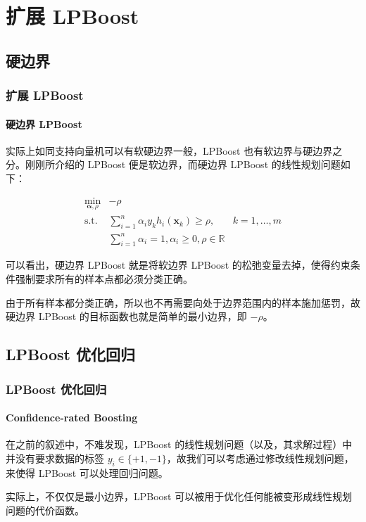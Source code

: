 \documentclass{ctexbeamer}
\begin{document}
    \section{扩展 LPBoost}
    \subsection{硬边界}

    \begin{frame}
        \frametitle{扩展 LPBoost}
        \framesubtitle{硬边界 LPBoost}

        实际上如同支持向量机可以有软硬边界一般，LPBoost 也有软边界与硬边界之分。刚刚所介绍的 LPBoost 便是软边界，而硬边界 LPBoost 的线性规划问题如下：

        \begin{align*}
            \min_{\pmb{\alpha},\rho} & -\!\!\rho & \\
            \mathrm{s.t.} & \sum_{i=1}^n \alpha_i y_k h_i(\pmb{x}_k) \geq \rho, & k = 1,\ldots,m \\
             & \sum_{i=1}^n \alpha_i = 1, \alpha_i \geq 0, \rho \in \mathbb{R} &
        \end{align*} \pause
    \end{frame}

    \begin{frame}

        可以看出，硬边界 LPBoost 就是将软边界 LPBoost 的松弛变量去掉，使得约束条件强制要求所有的样本点都必须分类正确。\pause
        
        由于所有样本都分类正确，所以也不再需要向处于边界范围内的样本施加惩罚，故硬边界 LPBoost 的目标函数也就是简单的最小边界，即 $-\rho$。

    \end{frame}

    \subsection{LPBoost 优化回归}

    \begin{frame}
        \frametitle{LPBoost 优化回归}
        \framesubtitle{Confidence-rated Boosting}
    
        在之前的叙述中，不难发现，LPBoost 的线性规划问题（以及，其求解过程）中并没有要求数据的标签 $y_i \in \{+1, -1\}$，故我们可以考虑通过修改线性规划问题，来使得 LPBoost 可以处理回归问题。\pause
        
        实际上，不仅仅是最小边界，LPBoost 可以被用于优化任何能被变形成线性规划问题的代价函数。
    
    \end{frame}
\end{document}
